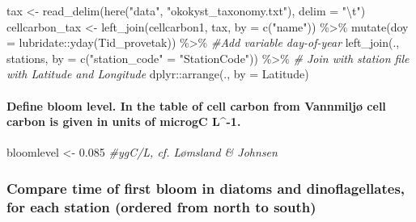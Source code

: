 \documentclass[
]{article}
\newenvironment{Shaded}{\begin{snugshade}}{\end{snugshade}}
\newcommand{\AttributeTok}[1]{\textcolor[rgb]{0.77,0.63,0.00}{#1}}
\newcommand{\CommentTok}[1]{\textcolor[rgb]{0.56,0.35,0.01}{\textit{#1}}}
\newcommand{\FloatTok}[1]{\textcolor[rgb]{0.00,0.00,0.81}{#1}}
\newcommand{\FunctionTok}[1]{\textcolor[rgb]{0.00,0.00,0.00}{#1}}
\newcommand{\NormalTok}[1]{#1}
\newcommand{\OtherTok}[1]{\textcolor[rgb]{0.56,0.35,0.01}{#1}}
\newcommand{\SpecialCharTok}[1]{\textcolor[rgb]{0.00,0.00,0.00}{#1}}
\newcommand{\StringTok}[1]{\textcolor[rgb]{0.31,0.60,0.02}{#1}}
\begin{document}
\begin{Shaded}
\begin{Highlighting}[]
\NormalTok{tax }\OtherTok{\textless{}{-}} \FunctionTok{read\_delim}\NormalTok{(}\FunctionTok{here}\NormalTok{(}\StringTok{"data"}\NormalTok{, }\StringTok{"okokyst\_taxonomy.txt"}\NormalTok{), }\AttributeTok{delim =} \StringTok{"}\SpecialCharTok{\textbackslash{}t}\StringTok{"}\NormalTok{)}
\NormalTok{cellcarbon\_tax }\OtherTok{\textless{}{-}} \FunctionTok{left\_join}\NormalTok{(cellcarbon1, tax, }\AttributeTok{by =} \FunctionTok{c}\NormalTok{(}\StringTok{"name"}\NormalTok{)) }\SpecialCharTok{\%\textgreater{}\%} 
  \FunctionTok{mutate}\NormalTok{(}\AttributeTok{doy =}\NormalTok{ lubridate}\SpecialCharTok{::}\FunctionTok{yday}\NormalTok{(Tid\_provetak)) }\SpecialCharTok{\%\textgreater{}\%} \CommentTok{\#Add variable day{-}of{-}year}
  \FunctionTok{left\_join}\NormalTok{(., stations, }\AttributeTok{by =} \FunctionTok{c}\NormalTok{(}\StringTok{"station\_code"} \OtherTok{=} \StringTok{"StationCode"}\NormalTok{)) }\SpecialCharTok{\%\textgreater{}\%} \CommentTok{\# Join with station file with Latitude and Longitude}
\NormalTok{  dplyr}\SpecialCharTok{::}\FunctionTok{arrange}\NormalTok{(., }\AttributeTok{by =}\NormalTok{ Latitude)}
\end{Highlighting}
\end{Shaded}

\hypertarget{define-bloom-level.-in-the-table-of-cell-carbon-from-vannmiljuxf8-cell-carbon-is-given-in-units-of-microgc-l-1.}{%
\paragraph{Define bloom level. In the table of cell carbon from
Vannmiljø cell carbon is given in units of microgC
L\^{}-1.}\label{define-bloom-level.-in-the-table-of-cell-carbon-from-vannmiljuxf8-cell-carbon-is-given-in-units-of-microgc-l-1.}}

\begin{Shaded}
\begin{Highlighting}[]
\NormalTok{bloomlevel }\OtherTok{\textless{}{-}} \FloatTok{0.085} \CommentTok{\#ygC/L, cf. Lømsland \& Johnsen}
\end{Highlighting}
\end{Shaded}

\hypertarget{compare-time-of-first-bloom-in-diatoms-and-dinoflagellates-for-each-station-ordered-from-north-to-south}{%
\subsubsection{Compare time of first bloom in diatoms and
dinoflagellates, for each station (ordered from north to
south)}\label{compare-time-of-first-bloom-in-diatoms-and-dinoflagellates-for-each-station-ordered-from-north-to-south}}
\end{document}
